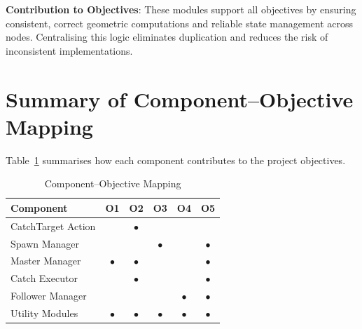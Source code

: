 \textbf{Contribution to Objectives}: These modules support all objectives by ensuring consistent, correct geometric computations and reliable state management across nodes. Centralising this logic eliminates duplication and reduces the risk of inconsistent implementations.

\section{Summary of Component--Objective Mapping}

Table~\ref{tab:mapping} summarises how each component contributes to the project objectives.

\begin{table}[htbp]
\centering
\caption{Component--Objective Mapping}
\label{tab:mapping}
\begin{tabular}{lccccc}
\toprule
\textbf{Component} & \textbf{O1} & \textbf{O2} & \textbf{O3} & \textbf{O4} & \textbf{O5} \\
\midrule
CatchTarget Action & & $\bullet$ & & & \\
Spawn Manager & & & $\bullet$ & & $\bullet$ \\
Master Manager & $\bullet$ & $\bullet$ & & & $\bullet$ \\
Catch Executor & & $\bullet$ & & & $\bullet$ \\
Follower Manager & & & & $\bullet$ & $\bullet$ \\
Utility Modules & $\bullet$ & $\bullet$ & $\bullet$ & $\bullet$ & $\bullet$ \\
\bottomrule
\end{tabular}
\end{table}
